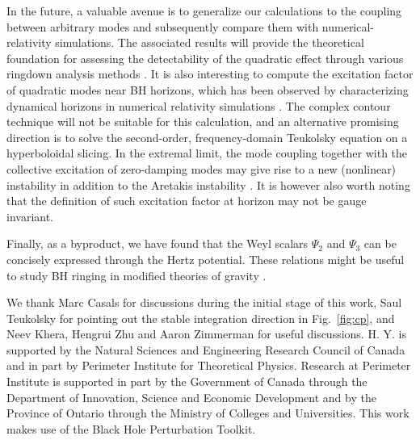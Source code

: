 \documentclass[aps,prd,amsmath,floats,floatfix, twocolumn,
superscriptaddress,nofootinbib,showpacs]{revtex4-1}
\newcommand{\red}{\textcolor{red}}
\begin{document}
In the future, a valuable avenue is to generalize our calculations to the coupling between arbitrary modes and subsequently compare them with numerical-relativity simulations. The associated results will provide the theoretical foundation for assessing the detectability of the quadratic effect through various ringdown analysis methods \cite{Carullo:2019flw,Isi:2021iql,Finch:2022ynt,Ma:2023vvr,Ma:2023cwe,Wang:2023xsy}. It is also interesting to compute the excitation factor of quadratic modes near BH horizons, which has been observed by characterizing dynamical horizons in numerical relativity simulations \cite{Khera:2023oyf}. The complex contour technique will not be suitable for this calculation, and an alternative promising direction is to solve the second-order, frequency-domain Teukolsky equation on a hyperboloidal slicing. In the extremal limit, the mode coupling together with the collective excitation \cite{Yang:2013uba,Casals:2016mel} of zero-damping modes \cite{Hod:2008se,Hod:2008zz,Yang:2012he,Yang:2012pj,Yang:2013uba} may give rise to a new (nonlinear) instability in addition to the Aretakis instability \cite{Aretakis:2010gd,Aretakis:2011ha,Aretakis:2011hc,Aretakis:2012ei}. It is however also worth noting that the definition of such excitation factor at horizon may not be gauge invariant. 

Finally, as a  byproduct, we have found that the Weyl scalars $\Psi_2$ and $\Psi_3$ can be concisely expressed through the Hertz potential. These relations might be useful to study BH ringing in modified theories of gravity \cite{Li:2022pcy,Hussain:2022ins,Wagle:2023fwl}.



\begin{acknowledgments}
We thank Marc Casals for discussions during the initial stage of this work, Saul Teukolsky for pointing out the stable integration direction in Fig.~\ref{fig:cp}, and Neev Khera, Hengrui Zhu and Aaron Zimmerman for useful discussions. H. Y. is supported by the Natural Sciences and
Engineering Research Council of Canada and in part by
Perimeter Institute for Theoretical Physics. Research at Perimeter Institute is supported in part by the Government of Canada through the Department of Innovation, Science and Economic Development and by the Province of Ontario through the Ministry of Colleges and Universities.
This work makes use of the Black Hole Perturbation Toolkit.
\end{acknowledgments}  
\end{document}
